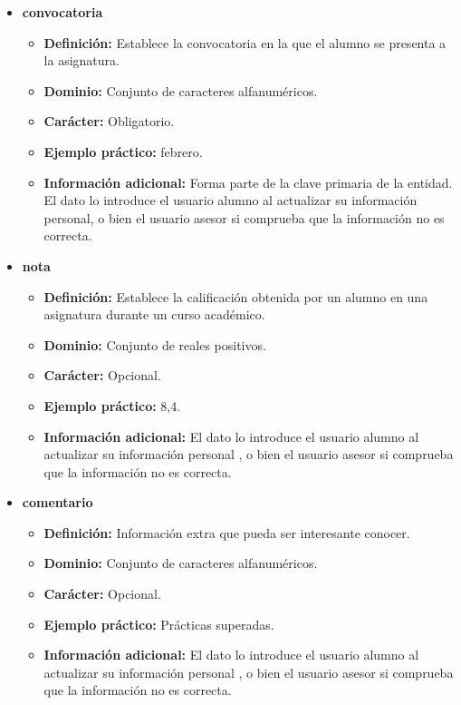 \begin{description}
   \begin{itemize}
    \item \textbf{convocatoria}
    \begin{itemize}
      \item \textbf{Definición:} Establece la convocatoria en la que el
      alumno se presenta a la asignatura.
      \item \textbf{Dominio:} Conjunto de caracteres alfanuméricos.
      \item \textbf{Carácter:} Obligatorio.
      \item \textbf{Ejemplo práctico:} febrero.
      \item \textbf{Información adicional:} Forma parte de la clave primaria de la
      entidad. El dato lo introduce el usuario alumno al actualizar
      su información personal, o bien el usuario asesor si
      comprueba que la información no es correcta.
    \end{itemize}
    \item \textbf{nota}
    \begin{itemize}
      \item \textbf{Definición:} Establece la calificación obtenida por un
      alumno en una asignatura durante un curso académico.
      \item \textbf{Dominio:} Conjunto de reales positivos.
      \item \textbf{Carácter:} Opcional.
      \item \textbf{Ejemplo práctico:} 8,4.
      \item \textbf{Información adicional:} El dato lo introduce el
      usuario alumno al actualizar su información personal , o
      bien el usuario asesor si comprueba que la información no es
      correcta.
    \end{itemize}
    \item \textbf{comentario}
    \begin{itemize}
      \item \textbf{Definición:} Información extra que pueda ser
      interesante conocer.
      \item \textbf{Dominio:} Conjunto de caracteres alfanuméricos.
      \item \textbf{Carácter:} Opcional.
      \item \textbf{Ejemplo práctico:} Prácticas superadas.
      \item \textbf{Información adicional:} El dato lo introduce el
      usuario alumno al actualizar su información personal , o
      bien el usuario asesor si comprueba que la información no es
      correcta.
    \end{itemize}
   \end{itemize}


\end{description}

